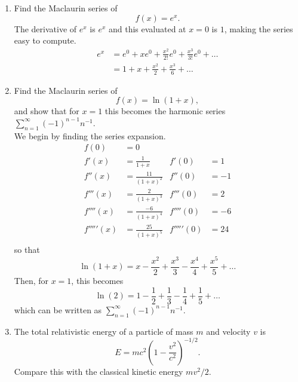 \documentclass{article}
\begin{document}
\begin{enumerate}
	\item{Find the Maclaurin series of 
		\begin{equation*}
			f(x) = e^x .
		\end{equation*}
		The derivative of $e^x$ is $e^x$ and this evaluated at $x=0$ is $1$, making the series easy to compute. \\
		\begin{align*}
			e^x &= e^0 + x e^0 + \frac{x^2}{2!} e^0 + \frac{x^3}{3!} e^0 + \ldots \\
			&= 1 + x + \frac{x^2}{2} + \frac{x^3}{6} + \ldots 
		\end{align*}
	}
	\item{Find the Maclaurin series of 
		\begin{equation*}
			f(x) = \ln (1+x) ,
		\end{equation*}
		and show that for $x=1$ this becomes the harmonic series $\sum_{n=1}^\infty (-1)^{n-1} n^{-1}$. \\
		We begin by finding the series expansion.
		\begin{align*}
			f(0) &= 0 \\
			f'(x) &= \frac{1}{1+x} & f'(0) &= 1 \\
			f''(x) &= \frac{11}{(1+x)^2} & f''(0) &= -1 \\
			f'''(x) &= \frac{2}{(1+x)^3} & f'''(0) &= 2 \\
			f''''(x) &= \frac{-6}{(1+x)^4} & f''''(0) &= -6 \\
			f'''''(x) &= \frac{25}{(1+x)^5} & f'''''(0) &= 24 \\
		\end{align*}
		so that 
		\begin{equation*}
			\ln (1+x) = x - \frac{x^2}{2} + \frac{x^3}{3} - \frac{x^4}{4} + \frac{x^5}{5} + \ldots
		\end{equation*}
		Then, for $x=1$, this becomes
		\begin{equation*}
			\ln (2) = 1 - \frac{1}{2} + \frac{1}{3} - \frac{1}{4} + \frac{1}{5} + \ldots
		\end{equation*}
		which can be written as $\sum_{n=1}^\infty (-1)^{n-1} n^{-1}$.
	}
	\item{The total relativistic energy of a particle of mass $m$ and velocity $v$ is 
		\begin{equation*}
			E = mc^2 \left( 1 - \frac{v^2}{c^2} \right)^{-1/2}.
		\end{equation*}
	Compare this with the classical kinetic energy $mv^2 / 2$. \\
}
\end{enumerate}
\end{document}
